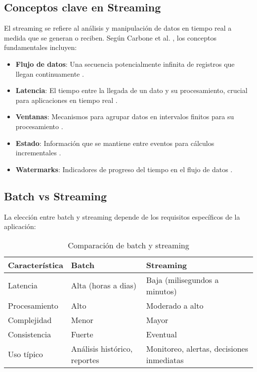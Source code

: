 \subsection{Conceptos clave en Streaming}

El streaming se refiere al análisis y manipulación de datos en tiempo real a medida que se generan o reciben. Según Carbone et al. \parencite{carbone2015apache}, los conceptos fundamentales incluyen:

\begin{itemize}
    \item \textbf{Flujo de datos}: Una secuencia potencialmente infinita de registros que llegan continuamente \parencite{akidau2015dataflow}.
    \item \textbf{Latencia}: El tiempo entre la llegada de un dato y su procesamiento, crucial para aplicaciones en tiempo real \parencite{akidau2015dataflow}.
    \item \textbf{Ventanas}: Mecanismos para agrupar datos en intervalos finitos para su procesamiento \parencite{akidau2015dataflow}.
    \item \textbf{Estado}: Información que se mantiene entre eventos para cálculos incrementales \parencite{carbone2015apache}.
    \item \textbf{Watermarks}: Indicadores de progreso del tiempo en el flujo de datos \parencite{akidau2015dataflow}.
\end{itemize}
\newpage
\subsection{Batch vs Streaming}

La elección entre batch y streaming depende de los requisitos específicos de la aplicación:

\begin{table}[h]
\centering
\begin{tabular}{|p{3cm}|p{5cm}|p{5cm}|}
\hline
\textbf{Característica} & \textbf{Batch} & \textbf{Streaming} \\
\hline
Latencia & Alta (horas a dias) & Baja (milisegundos a minutos) \\
\hline
Procesamiento & Alto & Moderado a alto \\
\hline
Complejidad & Menor & Mayor \\
\hline
Consistencia & Fuerte & Eventual \\
\hline
Uso típico & Análisis histórico, reportes & Monitoreo, alertas, decisiones inmediatas \\
\hline
\end{tabular}
\caption{Comparación de batch y streaming}
\label{tab:batch_vs_streaming}
\end{table}


